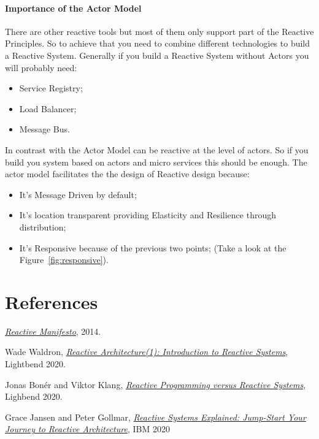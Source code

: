 \paragraph{Importance of the Actor Model}
There are other reactive tools but most of them only support part of the Reactive Principles. So to achieve that you need to combine different technologies to build a Reactive System. Generally if you build a Reactive System without Actors you will probably need:
\begin{itemize}
    \item Service Registry;
    \item Load Balancer;
    \item Message Bus.
\end{itemize}

In contrast with the Actor Model can be reactive at the level of actors. So if you build you system based on actors and micro services this should be enough.
The actor model facilitates the the design of Reactive design because:
\begin{itemize}
    \item It's Message Driven by default;
    \item It's location transparent providing Elasticity and Resilience through distribution;
    \item It's Responsive because of the previous two points; (Take a look at the Figure~\ref{fig:responsive}). 
\end{itemize}

\section{References}

\begin{thebibliography}{9}

\href{https://www.reactivemanifesto.org/}{\textit{Reactive Manifesto}}, 2014.

Wade Waldron, 
\href{https://academy.lightbend.com/courses/course-v1:lightbend+LRA-IntroToReactive+v1/about}{\textit{Reactive Architecture(1): Introduction to Reactive Systems}}, Lightbend 2020.

Jonas Bon\'er and Viktor Klang,
\href{https://www.lightbend.com/blog/white-paper-understanding-reactive-programming-vs-reactive-systems}{\textit{Reactive Programming versus Reactive Systems}}, Lighbend 2020.

Grace Jansen and Peter Gollmar,
\href{https://www.ibm.com/downloads/cas/YEEQBXND}{\textit{Reactive Systems Explained: Jump-Start Your Journey to Reactive Architecture}}, 
IBM 2020
\end{thebibliography}
